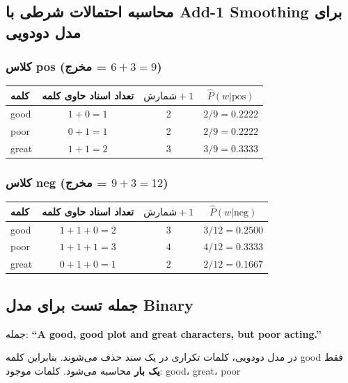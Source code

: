 \documentclass[11pt,a4paper]{article}
\newcommand{\en}[1]{\textenglish{#1}}
\begin{document}
\subsection*{محاسبه احتمالات شرطی با \en{Add-1 Smoothing} برای مدل دودویی}

\subsubsection*{کلاس \en{pos} (مخرج = $6 + 3 = 9$)}
\begin{center}
\begin{tabular}{|l|c|c|c|}
\hline
\textbf{کلمه} & \textbf{تعداد اسناد حاوی کلمه} & $\text{شمارش} + 1$ & $\hat{P}(w|\text{pos})$ \\
\hline
\en{good} & $1 + 0 = 1$ & 2 & $2/9 = 0.2222$ \\
\hline
\en{poor} & $0 + 1 = 1$ & 2 & $2/9 = 0.2222$ \\
\hline
\en{great} & $1 + 1 = 2$ & 3 & $3/9 = 0.3333$ \\
\hline
\end{tabular}
\end{center}

\subsubsection*{کلاس \en{neg} (مخرج = $9 + 3 = 12$)}
\begin{center}
\begin{tabular}{|l|c|c|c|}
\hline
\textbf{کلمه} & \textbf{تعداد اسناد حاوی کلمه} & $\text{شمارش} + 1$ & $\hat{P}(w|\text{neg})$ \\
\hline
\en{good} & $1 + 1 + 0 = 2$ & 3 & $3/12 = 0.2500$ \\
\hline
\en{poor} & $1 + 1 + 1 = 3$ & 4 & $4/12 = 0.3333$ \\
\hline
\en{great} & $0 + 1 + 0 = 1$ & 2 & $2/12 = 0.1667$ \\
\hline
\end{tabular}
\end{center}

\subsection*{جمله تست برای مدل \en{Binary}}
جمله: \textbf{\en{``A good, good plot and great characters, but poor acting.''}}

در مدل دودویی، کلمات تکراری در یک سند حذف می‌شوند. بنابراین کلمه \en{good} فقط \textbf{یک بار} محاسبه می‌شود. کلمات موجود: \en{good}، \en{great}، \en{poor}
\end{document}
